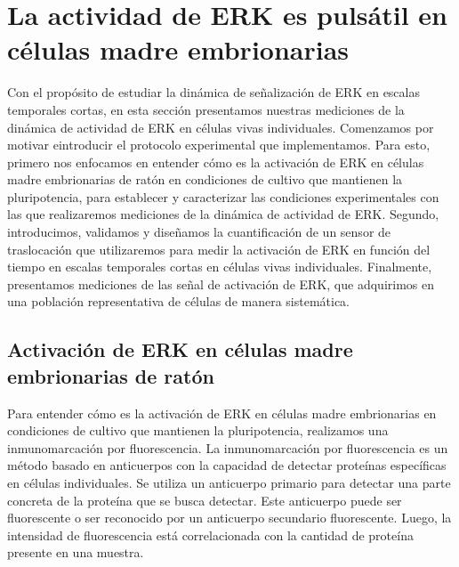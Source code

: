 \documentclass[./main.tex]{subfiles}
\begin{document}
\section{La actividad de ERK es pulsátil en células madre embrionarias}
\label{C2_sec:mediciones}

Con el propósito de estudiar la dinámica de señalización de ERK en escalas temporales cortas, en esta sección presentamos nuestras mediciones de la dinámica de actividad de ERK en células vivas individuales. Comenzamos por motivar eintroducir el protocolo experimental que implementamos. Para esto, primero nos enfocamos en entender cómo es la activación de ERK en células madre embrionarias de ratón en condiciones de cultivo que mantienen la pluripotencia, para establecer y caracterizar las condiciones experimentales con las que realizaremos mediciones de la dinámica de actividad de ERK. Segundo, introducimos, validamos y diseñamos la cuantificación de un sensor de traslocación que utilizaremos para medir la activación de ERK en función del tiempo en escalas temporales cortas en células vivas individuales. Finalmente, presentamos mediciones de las señal de activación de ERK, que adquirimos en una población representativa de células de manera sistemática. 


\subsection{Activación de ERK en células madre embrionarias de ratón}

Para entender cómo es la activación de ERK en células madre embrionarias en condiciones de cultivo que mantienen la pluripotencia, realizamos una inmunomarcación por fluorescencia. La inmunomarcación por fluorescencia es un método basado en anticuerpos con la capacidad de detectar proteínas específicas en células individuales. Se utiliza un anticuerpo primario para detectar una parte concreta de la proteína que se busca detectar. Este anticuerpo puede ser fluorescente o ser reconocido por un anticuerpo secundario fluorescente. Luego, la intensidad de fluorescencia está correlacionada con la cantidad de proteína presente en una muestra.
\end{document}
